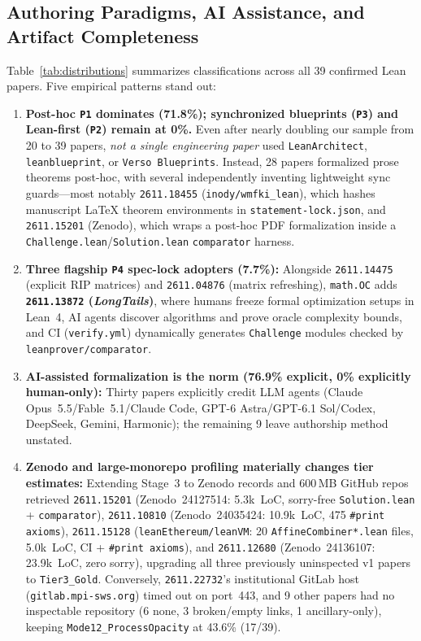 \documentclass[11pt,letterpaper]{article}
\begin{document}
\subsection{Authoring Paradigms, AI Assistance, and Artifact Completeness}
Table~\ref{tab:distributions} summarizes classifications across all 39 confirmed Lean papers. Five empirical patterns stand out:

\begin{enumerate}
  \item \textbf{Post-hoc \texttt{P1} dominates (71.8\%); synchronized blueprints (\texttt{P3}) and Lean-first (\texttt{P2}) remain at 0\%.} Even after nearly doubling our sample from 20 to 39 papers, \emph{not a single engineering paper} used \texttt{LeanArchitect}, \texttt{leanblueprint}, or \texttt{Verso Blueprints}. Instead, 28 papers formalized prose theorems post-hoc, with several independently inventing lightweight sync guards---most notably \texttt{2611.18455} (\texttt{inody/wmfki\_lean}), which hashes manuscript \LaTeX{} theorem environments in \texttt{statement-lock.json}, and \texttt{2611.15201} (Zenodo), which wraps a post-hoc PDF formalization inside a \texttt{Challenge.lean}/\texttt{Solution.lean} \texttt{comparator} harness.
  \item \textbf{Three flagship \texttt{P4} spec-lock adopters (7.7\%):} Alongside \texttt{2611.14475} (explicit RIP matrices) and \texttt{2611.04876} (matrix refreshing), \texttt{math.OC} adds \textbf{\texttt{2611.13872} (\emph{LongTails})}, where humans freeze formal optimization setups in Lean~4, AI agents discover algorithms and prove oracle complexity bounds, and CI (\texttt{verify.yml}) dynamically generates \texttt{Challenge} modules checked by \texttt{leanprover/comparator}.
  \item \textbf{AI-assisted formalization is the norm (76.9\% explicit, 0\% explicitly human-only):} Thirty papers explicitly credit LLM agents (Claude Opus~5.5/Fable~5.1/Claude Code, GPT-6 Astra/GPT-6.1 Sol/Codex, DeepSeek, Gemini, Harmonic); the remaining 9 leave authorship method unstated.
  \item \textbf{Zenodo and large-monorepo profiling materially changes tier estimates:} Extending Stage~3 to Zenodo records and 600\,MB GitHub repos retrieved \texttt{2611.15201} (Zenodo~24127514: 5.3k~LoC, sorry-free \texttt{Solution.lean} + \texttt{comparator}), \texttt{2611.10810} (Zenodo~24035424: 10.9k~LoC, 475 \texttt{\#print axioms}), \texttt{2611.15128} (\texttt{leanEthereum/leanVM}: 20 \texttt{AffineCombiner*.lean} files, 5.0k~LoC, CI + \texttt{\#print axioms}), and \texttt{2611.12680} (Zenodo~24136107: 23.9k~LoC, zero sorry), upgrading all three previously uninspected v1 papers to \texttt{Tier3\_Gold}. Conversely, \texttt{2611.22732}'s institutional GitLab host (\texttt{gitlab.mpi-sws.org}) timed out on port~443, and 9 other papers had no inspectable repository (6 none, 3 broken/empty links, 1 ancillary-only), keeping \texttt{Mode12\_ProcessOpacity} at 43.6\% (17/39).

\end{enumerate}
\end{document}
